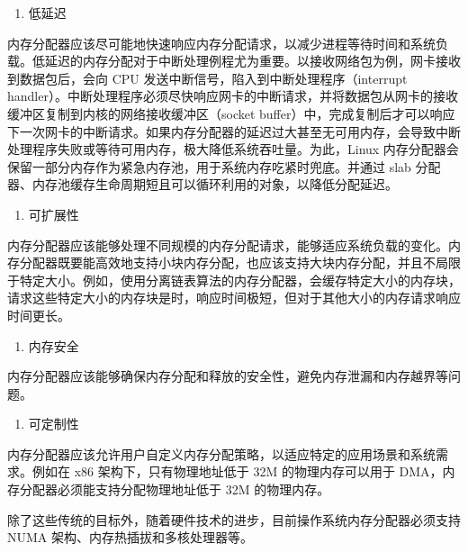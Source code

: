 \documentclass[AutoFakeBold]{LZUThesis}
\newcommand{\tightlist}{%
  \setlength{\itemsep}{0pt}\setlength{\parskip}{0pt}}
\begin{document}
\begin{sloppypar}
\begin{enumerate}
\def\labelenumi{\arabic{enumi}.}
\setcounter{enumi}{1}
\tightlist
\item
  低延迟
\end{enumerate}

内存分配器应该尽可能地快速响应内存分配请求，以减少进程等待时间和系统负载。低延迟的内存分配对于中断处理例程尤为重要。以接收网络包为例，网卡接收到数据包后，会向
CPU 发送中断信号，陷入到中断处理程序（interrupt handler）。中断处理程序必须尽快响应网卡的中断请求，并将数据包从网卡的接收缓冲区复制到内核的网络接收缓冲区（socket buffer）中，完成复制后才可以响应下一次网卡的中断请求。如果内存分配器的延迟过大甚至无可用内存，会导致中断处理程序失败或等待可用内存，极大降低系统吞吐量。为此，Linux 内存分配器会保留一部分内存作为紧急内存池，用于系统内存吃紧时兜底。并通过 slab 分配器、内存池缓存生命周期短且可以循环利用的对象，以降低分配延迟。

\begin{enumerate}
\def\labelenumi{\arabic{enumi}.}
\setcounter{enumi}{2}
\tightlist
\item
  可扩展性
\end{enumerate}

内存分配器应该能够处理不同规模的内存分配请求，能够适应系统负载的变化。内存分配器既要能高效地支持小块内存分配，也应该支持大块内存分配，并且不局限于特定大小。例如，使用分离链表算法的内存分配器，会缓存特定大小的内存块，请求这些特定大小的内存块是时，响应时间极短，但对于其他大小的内存请求响应时间更长。

\begin{enumerate}
\def\labelenumi{\arabic{enumi}.}
\setcounter{enumi}{3}
\tightlist
\item
  内存安全
\end{enumerate}

内存分配器应该能够确保内存分配和释放的安全性，避免内存泄漏和内存越界等问题。

\begin{enumerate}
\def\labelenumi{\arabic{enumi}.}
\setcounter{enumi}{4}
\tightlist
\item
  可定制性
\end{enumerate}

内存分配器应该允许用户自定义内存分配策略，以适应特定的应用场景和系统需求。例如在 x86 架构下，只有物理地址低于 32M 的物理内存可以用于
DMA，内存分配器必须能支持分配物理地址低于 32M 的物理内存。

除了这些传统的目标外，随着硬件技术的进步，目前操作系统内存分配器必须支持
NUMA 架构、内存热插拔和多核处理器等。


\end{sloppypar}
\end{document}
